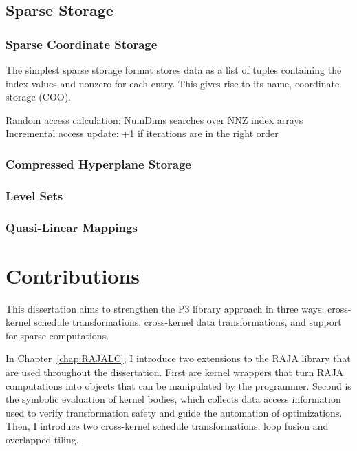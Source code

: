 \subsection{Sparse Storage}

\subsubsection{Sparse Coordinate Storage}

The simplest sparse storage format stores data as a list of tuples containing the index values and nonzero for each entry.
This gives rise to its name, coordinate storage (COO).


Random access calculation: NumDims searches over NNZ index arrays
Incremental access update: +1 if iterations are in the right order

\subsubsection{Compressed Hyperplane Storage}




\subsubsection{Level Sets}

\subsubsection{Quasi-Linear Mappings}

\section{Contributions}

This dissertation aims to strengthen the P3 library approach in three ways: cross-kernel schedule transformations, cross-kernel data transformations, and support for sparse computations.

In Chapter~\ref{chap:RAJALC}, I introduce two extensions to the RAJA library that are used throughout the dissertation.
First are kernel wrappers that turn RAJA computations into objects that can be manipulated by the programmer.
Second is the symbolic evaluation of kernel bodies, which collects data access information used to verify transformation safety and guide the automation of optimizations.
Then, I introduce two cross-kernel schedule transformations: loop fusion and overlapped tiling.

